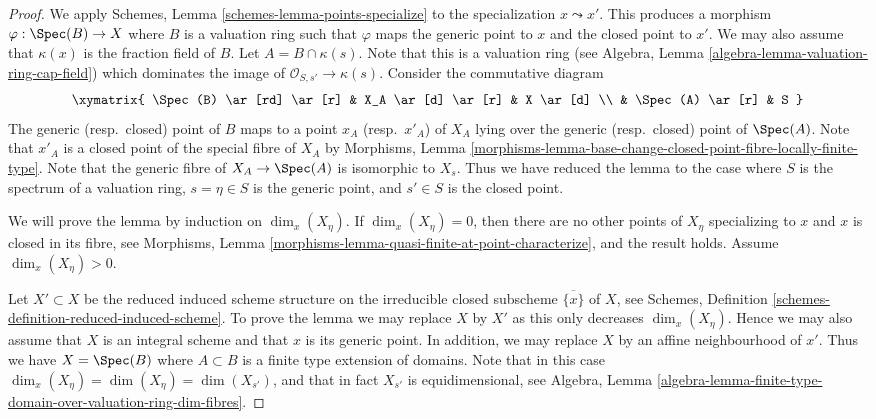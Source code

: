 \begin{proof}
We apply
Schemes, Lemma \ref{schemes-lemma-points-specialize}
to the specialization $x \leadsto x'$.
This produces a morphism $\varphi : \Spec(B) \to X$
where $B$ is a valuation ring such that $\varphi$ maps the
generic point to $x$ and the closed point to $x'$. We may also
assume that $\kappa(x)$ is the fraction field of $B$.
Let $A = B \cap \kappa(s)$. Note that this is a valuation ring (see
Algebra, Lemma \ref{algebra-lemma-valuation-ring-cap-field})
which dominates the image of $\mathcal{O}_{S, s'} \to \kappa(s)$.
Consider the commutative diagram
$$
\xymatrix{
\Spec(B) \ar[rd] \ar[r] &
X_A \ar[d] \ar[r] & X \ar[d] \\
& \Spec(A) \ar[r] & S
}
$$
The generic (resp.\ closed) point of $B$ maps to a point $x_A$
(resp.\ $x'_A$) of $X_A$ lying over the generic (resp.\ closed)
point of $\Spec(A)$. Note that $x'_A$ is a closed point
of the special fibre of $X_A$ by
Morphisms,
Lemma \ref{morphisms-lemma-base-change-closed-point-fibre-locally-finite-type}.
Note that the generic fibre of $X_A \to \Spec(A)$ is isomorphic
to $X_s$. Thus we have reduced the lemma to the case where $S$ is
the spectrum of a valuation ring, $s = \eta \in S$ is the generic point, and
$s' \in S$ is the closed point.

\medskip\noindent
We will prove the lemma by induction on $\dim_x(X_\eta)$.
If $\dim_x(X_\eta) = 0$, then there are no other points of $X_\eta$
specializing to $x$ and $x$ is closed in its fibre, see
Morphisms, Lemma \ref{morphisms-lemma-quasi-finite-at-point-characterize},
and the result holds. Assume $\dim_x(X_\eta) > 0$.

\medskip\noindent
Let $X' \subset X$ be the reduced induced scheme structure on
the irreducible closed subscheme $\overline{\{x\}}$ of $X$, see
Schemes, Definition \ref{schemes-definition-reduced-induced-scheme}.
To prove the lemma we may replace $X$ by $X'$ as this only decreases
$\dim_x(X_\eta)$. Hence we may also assume that $X$ is an integral scheme
and that $x$ is its generic point. In addition, we may replace $X$ by an
affine neighbourhood of $x'$. Thus we have $X = \Spec(B)$ where
$A \subset B$ is a finite type extension of domains. Note that in
this case $\dim_x(X_\eta) = \dim(X_\eta) = \dim(X_{s'})$, and that in fact
$X_{s'}$ is equidimensional, see
Algebra,
Lemma \ref{algebra-lemma-finite-type-domain-over-valuation-ring-dim-fibres}.


\end{proof}

